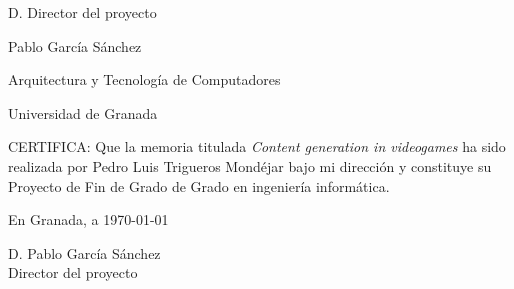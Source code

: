 %
%

\begin{center}
	\begin{minipage}[t][6cm][l]{.8\textwidth}
		\begin{center}
			D. {\sc Director del proyecto}

			Pablo García Sánchez

			Arquitectura y Tecnología de Computadores

			Universidad de Granada
		\end{center}
	\end{minipage}
\end{center}

CERTIFICA:
Que la memoria titulada {\it Content generation in videogames} ha sido realizada por {\sc Pedro Luis Trigueros Mondéjar} bajo mi dirección y constituye su Proyecto de Fin de Grado de Grado en ingeniería informática.

\vspace{5cm}

En Granada, a \today

\vspace{3cm}

\begin{center}
	\begin{minipage}[t][4cm][l]{.5\textwidth}
	D. {\sc Pablo García Sánchez}
	\\
	Director del proyecto
	\end{minipage}
\end{center}
